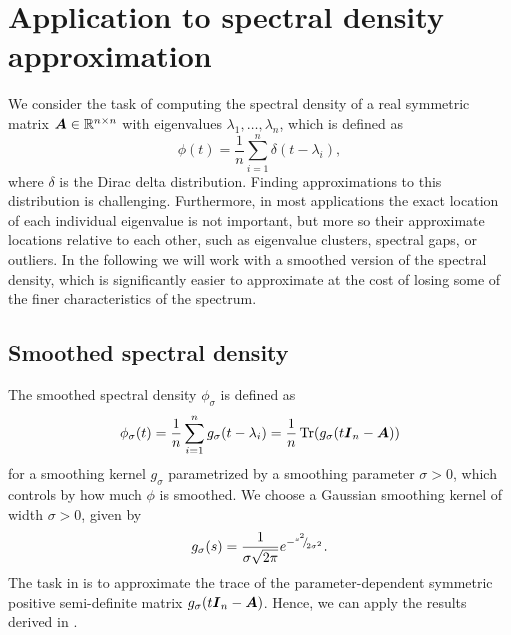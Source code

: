 
\section{Application to spectral density approximation}
\label{sec:application}

We consider the task of computing the spectral density of a real symmetric matrix $\boldsymbol{A} \in \mathbb{R}^{n \times n}$ with eigenvalues $\lambda_1, \dots, \lambda_n$, which is defined as
\begin{equation}
    \phi(t) = \frac{1}{n} \sum_{i=1}^{n} \delta(t - \lambda_i),
    \label{equ:spectral-density}
\end{equation}
where $\delta$ is the Dirac delta distribution. Finding approximations to this distribution is challenging. Furthermore, in most applications the exact location of each individual eigenvalue is not important, but more so their approximate locations relative to each other, such as eigenvalue clusters, spectral gaps, or outliers. In the following we will work with a smoothed version of the spectral density, which is significantly easier to approximate at the cost of losing some of the finer characteristics of the spectrum.

\subsection{Smoothed spectral density}
\label{subsec:spectral-density}

The smoothed spectral density $\phi_{\sigma}$ is defined as
\begin{equation}
    \phi_{\sigma}(t) = \frac{1}{n} \sum_{i=1}^{n} g_{\sigma}(t - \lambda_i) = \frac{1}{n} \operatorname{Tr}(g_{\sigma}(t\boldsymbol{I}_n - \boldsymbol{A}))
    \label{equ:smooth-spectral-density}
\end{equation}
for a smoothing kernel $g_{\sigma}$ parametrized by a smoothing parameter $\sigma > 0$, which controls by how much $\phi$ is smoothed. We choose a Gaussian smoothing kernel of width $\sigma > 0$, given by
\begin{equation}
    g_{\sigma}(s) = \frac{1}{\sigma \sqrt{2\pi}} e^{-{}^{s^2}{\mskip -5mu/\mskip -3mu}_{2\sigma^2}}.
    \label{equ:smoothing-kernel}
\end{equation}
The task in  is to approximate the trace of the parameter-dependent symmetric positive semi-definite matrix $g_{\sigma}(t\boldsymbol{I}_n - \boldsymbol{A})$. Hence, we can apply the results derived in .

